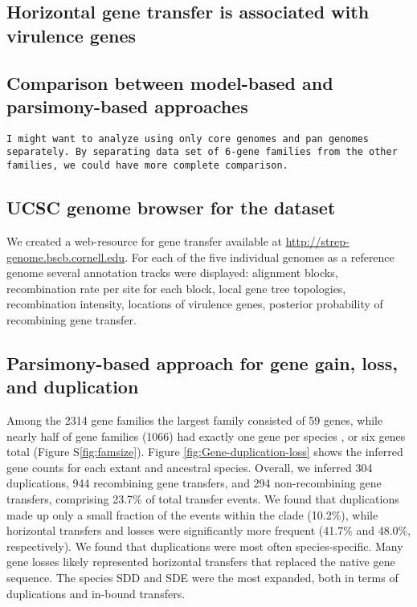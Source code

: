 \documentclass[english]{article}
\begin{document}
\subsection{Horizontal gene transfer is associated with virulence genes}

\subsection{Comparison between model-based and parsimony-based approaches}
\texttt{I might want to analyze using only core genomes and pan genomes
separately. By separating data set of 6-gene families from the other families,
we could have more complete comparison.}


\subsection{UCSC genome browser for the dataset}
We created a web-resource for gene transfer available at
\url{http://strep-genome.bscb.cornell.edu}.  For each of the five individual
genomes as a reference genome several annotation tracks were displayed:
alignment blocks, recombination rate per site for each block, local gene tree
topologies, recombination
intensity, locations of virulence genes, posterior probability of recombining
gene transfer.  

\subsection{Parsimony-based approach for gene gain, loss, and duplication}
Among the 2314 gene families
the largest family consisted of 59 genes, while
nearly half of gene families (1066) had exactly one gene per species
, or six genes total (Figure S\ref{fig:famsize}).
Figure \ref{fig:Gene-duplication-loss} shows the
inferred gene counts for each extant and ancestral species. Overall,
we inferred 304 duplications, 944 recombining gene transfers, and 294
non-recombining gene transfers, comprising 23.7\% of total transfer
events.  We found that duplications made up only a small fraction of
the events within the clade (10.2\%), while horizontal transfers and
losses were significantly more frequent (41.7\% and 48.0\%,
respectively). We found that duplications were most often
species-specific. Many gene losses likely represented horizontal
transfers that replaced the native gene sequence.  The species SDD and
SDE were the most expanded, both in terms of duplications and in-bound
transfers.
\end{document}
